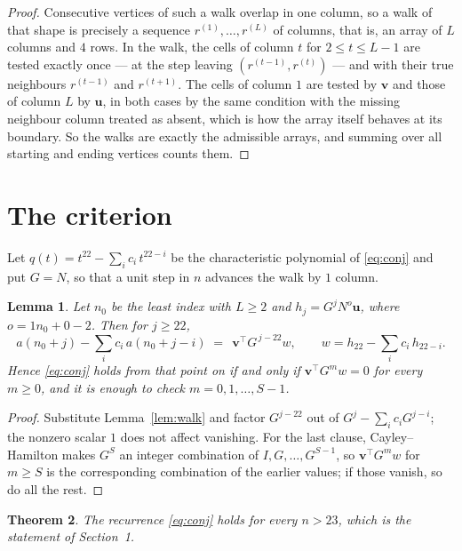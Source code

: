 \documentclass[11pt,a4paper]{article}
\theoremstyle{plain}
\newtheorem{theorem}{Theorem}
\newtheorem{lemma}[theorem]{Lemma}
\theoremstyle{definition}
\begin{document}
\begin{proof}
Consecutive vertices of such a walk overlap in one column, so a walk of that shape is
precisely a sequence $r^{(1)},\dots,r^{(L)}$ of columns, that is, an array of $L$ columns
and $4$ rows. In the walk, the cells of column $t$ for $2\le t\le L-1$ are tested
exactly once --- at the step leaving $(r^{(t-1)},r^{(t)})$ --- and with their true
neighbours $r^{(t-1)}$ and $r^{(t+1)}$. The cells of column $1$ are tested by
$\mathbf{v}$ and those of column $L$ by $\mathbf{u}$, in both cases by the same condition
with the missing neighbour column treated as absent, which is how the array itself behaves at
its boundary. So the walks are exactly the admissible arrays, and summing over all starting
and ending vertices counts them.
\end{proof}

\section{The criterion}

Let $q(t)=t^{22}-\sum_i c_i\,t^{22-i}$ be the characteristic polynomial of
\eqref{eq:conj} and put $G=N$, so that a unit step in $n$ advances the walk by
$1$ column.

\begin{lemma}\label{lem:crit}
Let $n_0$ be the least index with $L\ge2$ and $h_j=G^{j}N^{o}\mathbf{u}$, where
$o=1n_0+0-2$. Then for $j\ge22$,
\[
a(n_0+j)-\sum_i c_i\,a(n_0+j-i)\;=\;\,\mathbf{v}^{\!\top}G^{\,j-22}w,
\qquad w=h_{22}-\sum_i c_i\,h_{22-i} .
\]
Hence \eqref{eq:conj} holds from that point on if and only if
$\mathbf{v}^{\!\top}G^{m}w=0$ for every $m\ge0$, and it is enough to check
$m=0,1,\dots,S-1$.
\end{lemma}

\begin{proof}
Substitute Lemma~\ref{lem:walk} and factor $G^{j-22}$ out of
$G^{j}-\sum_ic_iG^{j-i}$; the nonzero scalar $1$ does not affect
vanishing. For the last clause, Cayley--Hamilton makes $G^{S}$ an integer combination of
$I,G,\dots,G^{S-1}$, so $\mathbf{v}^{\!\top}G^{m}w$ for $m\ge S$ is the corresponding
combination of the earlier values; if those vanish, so do all the rest.
\end{proof}

\begin{theorem}
The recurrence \eqref{eq:conj} holds for every $n>23$, which is the statement of
Section~1.
\end{theorem}
\end{document}

